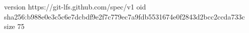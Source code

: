version https://git-lfs.github.com/spec/v1
oid sha256:b988e0e3c5c6e7dcbdf9e2f7c779ec7a9fdb5531674e0f2843d2bcc2ccda733c
size 75
